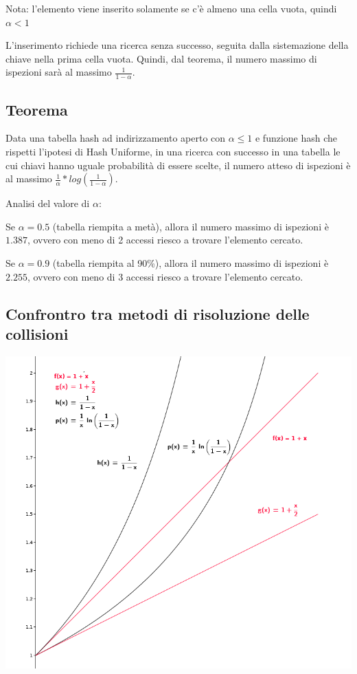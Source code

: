 \documentclass[tikz]{article}
\begin{document}
{Nota: l'elemento viene inserito solamente se c'è almeno una cella vuota, quindi $\alpha < 1$}

{L'inserimento richiede una ricerca senza successo, seguita dalla sistemazione della chiave nella prima cella vuota. Quindi, dal teorema, il numero massimo di ispezioni sarà al massimo $\frac{1}{1-\alpha}$.}

\subsection{Teorema}

{Data una tabella hash ad indirizzamento aperto con $\alpha \leq 1$ e funzione hash che rispetti l'ipotesi di Hash Uniforme, in una ricerca con successo in una tabella le cui chiavi hanno uguale probabilità di essere scelte, il numero atteso di ispezioni è al massimo $\frac{1}{\alpha} * log(\frac{1}{1-\alpha})$.}

{Analisi del valore di $\alpha$:}

{Se $\alpha=0.5$ (tabella riempita a metà), allora il numero massimo di ispezioni è $1.387$, ovvero con meno di 2 accessi riesco a trovare l'elemento cercato.}

{Se $\alpha=0.9$ (tabella riempita al 90\%), allora il numero massimo di ispezioni è $2.255$, ovvero con meno di 3 accessi riesco a trovare l'elemento cercato.}

\subsection{Confrontro tra metodi di risoluzione delle collisioni}

{\includegraphics{images/image541.png}}
\end{document}
